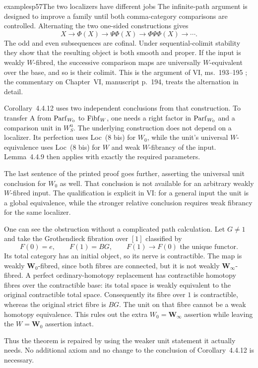 \begin{dcomment}{examples}{p57}{The two localizers have different jobs}
The infinite-path argument is designed to improve a family until both comma-category comparisons are controlled. Alternating the two one-sided constructions gives
\[
 X\longrightarrow\Phi(X)\longrightarrow\Psi\Phi(X)
 \longrightarrow\Phi\Psi\Phi(X)\longrightarrow\cdots.
\]
The odd and even subsequences are cofinal. Under sequential-colimit stability they show that the resulting object is both smooth and proper. If the input is weakly $W$-fibred, the successive comparison maps are universally $W$-equivalent over the base, and so is their colimit. This is the argument of VI, ms.~193--195 \citep{Grothendieck1990VI}; the commentary on Chapter~VI, manuscript p.~194, treats the alternation in detail.

Corollary~4.4.12 uses two independent conclusions from that construction. To transfer A from $\mathrm{Parf}_{W_0}$ to $\mathrm{Fibf}_W$, one needs a right factor in $\mathrm{Parf}_{W_0}$ and a comparison unit in $W_S^{\mathrm u}$. The underlying construction does not depend on a localizer. Its perfection uses Loc~(8 bis) for $W_0$, while the unit's universal $W$-equivalence uses Loc~(8 bis) for $W$ and weak $W$-fibrancy of the input. Lemma~4.4.9 then applies with exactly the required parameters.

The last sentence of the printed proof goes further, asserting the universal unit conclusion for $W_0$ as well. That conclusion is not available for an arbitrary weakly $W$-fibred input. The qualification is explicit in VI: for a general input the unit is a global equivalence, while the stronger relative conclusion requires weak fibrancy for the same localizer.

One can see the obstruction without a complicated path calculation. Let $G\ne1$ and take the Grothendieck fibration over $[1]$ classified by
\[
 F(0)=e,\qquad F(1)=BG,\qquad F(1)\longrightarrow F(0)
 \text{ the unique functor}.
\]
Its total category has an initial object, so its nerve is contractible. The map is weakly $\mathbf W_0$-fibred, since both fibres are connected, but it is not weakly $\mathbf W_\infty$-fibred. A perfect ordinary-homotopy replacement has contractible homotopy fibres over the contractible base: its total space is weakly equivalent to the original contractible total space. Consequently its fibre over $1$ is contractible, whereas the original strict fibre is $BG$. The unit on that fibre cannot be a weak homotopy equivalence. This rules out the extra $W_0=\mathbf W_\infty$ assertion while leaving the $W=\mathbf W_0$ assertion intact.

Thus the theorem is repaired by using the weaker unit statement it actually needs. No additional axiom and no change to the conclusion of Corollary~4.4.12 is necessary.
\end{dcomment}


